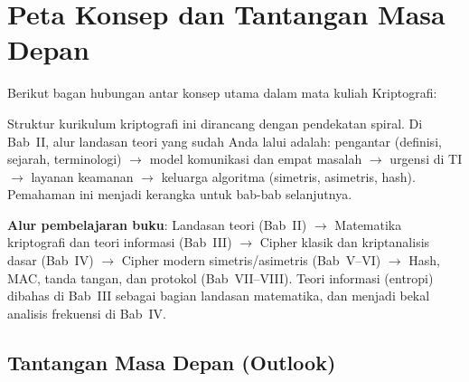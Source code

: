 ﻿\section{Peta Konsep dan Tantangan Masa Depan}

Berikut bagan hubungan antar konsep utama dalam mata kuliah Kriptografi:

\begin{center}
\end{center}

Struktur kurikulum kriptografi ini dirancang dengan pendekatan spiral. Di Bab~II, alur landasan teori yang sudah Anda lalui adalah: pengantar (definisi, sejarah, terminologi) $\to$ model komunikasi dan empat masalah $\to$ urgensi di TI $\to$ layanan keamanan $\to$ keluarga algoritma (simetris, asimetris, hash). Pemahaman ini menjadi kerangka untuk bab-bab selanjutnya.

\textbf{Alur pembelajaran buku}: Landasan teori (Bab~II) $\to$ Matematika kriptografi dan teori informasi (Bab~III) $\to$ Cipher klasik dan kriptanalisis dasar (Bab~IV) $\to$ Cipher modern simetris/asimetris (Bab~V--VI) $\to$ Hash, MAC, tanda tangan, dan protokol (Bab~VII--VIII). Teori informasi (entropi) dibahas di Bab~III sebagai bagian landasan matematika, dan menjadi bekal analisis frekuensi di Bab~IV.

\subsection{Tantangan Masa Depan (Outlook)}


